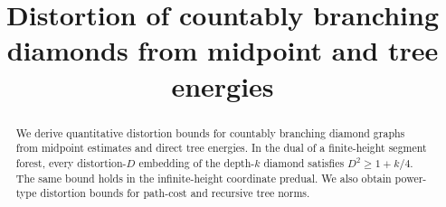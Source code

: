 
\title{Distortion of countably branching diamonds from midpoint and tree energies}

\maketitle
\begin{abstract}
We derive quantitative distortion bounds for countably branching diamond
graphs from midpoint estimates and direct tree energies. In the dual of
a finite-height segment forest, every distortion-$D$ embedding of the
depth-$k$ diamond satisfies $D^2\ge1+k/4$. The same bound holds in the
infinite-height coordinate predual. We also obtain power-type distortion
bounds for path-cost and recursive tree norms.
\end{abstract}






\appendix




